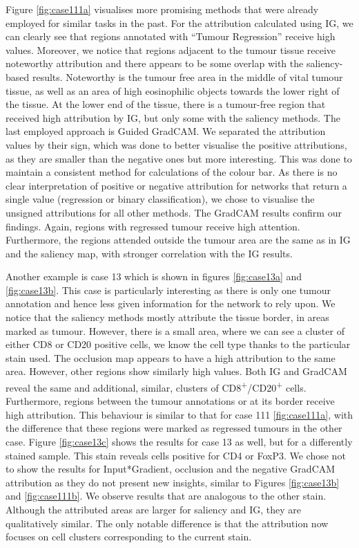 Figure \ref{fig:case111a} visualises more promising methods that were already employed for similar tasks in the past. \cite{Chen2022Pathomic, Chen2021Multimodal} For the attribution calculated using IG, we can clearly see that regions annotated with “Tumour Regression” receive high values. Moreover, we notice that regions adjacent to the tumour tissue receive noteworthy attribution and there appears to be some overlap with the saliency-based results. Noteworthy is the tumour free area in the middle of vital tumour tissue, as well as an area of high eosinophilic objects towards the lower right of the tissue. At the lower end of the tissue, there is a tumour-free region that received high attribution by IG, but only some with the saliency methods. The last employed approach is Guided GradCAM. We separated the attribution values by their sign, which was done to better visualise the positive attributions, as they are smaller than the negative ones but more interesting. This was done to maintain a consistent method for calculations of the colour bar. As there is no clear interpretation of positive or negative attribution for networks that return a single value (regression or binary classification), we chose to visualise the unsigned attributions for all other methods. 
The GradCAM results confirm our findings. Again, regions with regressed tumour receive high attention. Furthermore, the regions attended outside the tumour area are the same as in IG and the saliency map, with stronger correlation with the IG results.

Another example is case 13 which is shown in figures \ref{fig:case13a} and \ref{fig:case13b}. This case is particularly interesting as there is only one tumour annotation and hence less given information for the network to rely upon. We notice that the saliency methods mostly attribute the tissue border, in areas marked as tumour. However, there is a small area, where we can see a cluster of either CD8 or CD20 positive cells, we know the cell type thanks to the particular stain used. The occlusion map appears to have a high attribution to the same area. However, other regions show similarly high values. 
Both IG and GradCAM reveal the same and additional, similar, clusters of CD8\textsuperscript{+}/CD20\textsuperscript{+} cells. Furthermore, regions between the tumour annotations or at its border receive high attribution. This behaviour is similar to that for case 111 \ref{fig:case111a}, with the difference that these regions were marked as regressed tumours in the other case. 
Figure \ref{fig:case13c} shows the results for case 13 as well, but for a differently stained sample. This stain reveals cells positive for CD4 or FoxP3. We chose not to show the results for Input*Gradient, occlusion and the negative GradCAM attribution as they do not present new insights, similar to Figures \ref{fig:case13b} and \ref{fig:case111b}. We observe results that are analogous to the other stain. Although the attributed areas are larger for saliency and IG, they are qualitatively similar. The only notable difference is that the attribution now focuses on cell clusters corresponding to the current stain.

